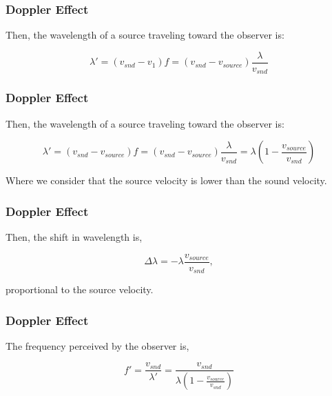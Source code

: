 \documentclass[]{beamer}
\begin{document}
\begin{frame}
\frametitle{Doppler Effect}


Then, the wavelength of a source traveling toward the observer is:

\begin{equation}
\lambda'=(v_{snd}-v_1)f=(v_{snd}-v_{source})\frac{\lambda}{v_{snd}}
\end{equation}


  \end{frame}

\begin{frame}
\frametitle{Doppler Effect}


Then, the wavelength of a source traveling toward the observer is:

\begin{equation}
\lambda'=(v_{snd}-v_{source})f=(v_{snd}-v_{source})\frac{\lambda}{v_{snd}}=\lambda(1-\frac{v_{source}}{v_{snd}})
\end{equation}

\pause

Where we consider that the source velocity is lower than the sound velocity. 
  \end{frame}


\begin{frame}
\frametitle{Doppler Effect}


Then, the shift in wavelength is,

\pause
\begin{equation}
\Delta \lambda=-\lambda \frac{v_{source}}{v_{snd}},
\end{equation}
\pause

proportional to the source velocity.

  \end{frame}

\begin{frame}
\frametitle{Doppler Effect}


The frequency perceived by the observer is,

\begin{equation}
f'=\frac{v_{snd}}{\lambda '}=\frac{v_{snd}}{\lambda(1-\frac{v_{source}}{v_{snd}})}
\end{equation}


  \end{frame}
\end{document}
